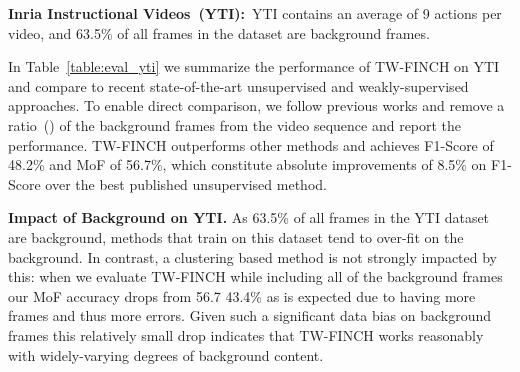 \documentclass[10pt,twocolumn,letterpaper]{article}
\begin{document}
\noindent\textbf{Inria Instructional Videos~(YTI):}\ YTI contains an average of 9 actions per video, and 63.5\% of all frames in the dataset are background frames.

In Table~\ref{table:eval_yti} we summarize the performance of TW-FINCH on YTI and compare to recent state-of-the-art unsupervised and weakly-supervised approaches. To enable direct comparison, we follow previous works and remove a ratio~() of the background frames from the video sequence and report the performance. TW-FINCH  outperforms other methods and achieves F1-Score of 48.2\% and MoF of 56.7\%, which constitute absolute improvements of 8.5\% on F1-Score over the best published unsupervised method. 

\textbf{Impact of Background on YTI.} As  63.5\% of all frames in the YTI dataset are background, methods that train on this dataset tend to over-fit on the background. 
In contrast, a clustering based method is not strongly impacted by this: when we evaluate TW-FINCH while including all of the background frames our MoF accuracy drops from 56.7  43.4\% as is expected due to having more frames and thus more errors. Given such a significant data bias on background frames this relatively small drop indicates 
that TW-FINCH works reasonably with widely-varying degrees of background content.
\end{document}
